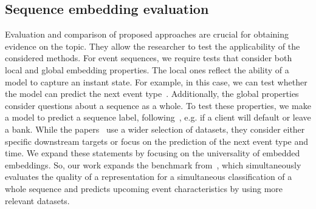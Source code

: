 \subsection{Sequence embedding evaluation}
Evaluation and comparison of proposed approaches are crucial for obtaining evidence on the topic. They allow the researcher to test the applicability of the considered methods.
For event sequences, we require tests that consider both local and global embedding properties.
The local ones reflect the ability of a model to capture an instant state.
For example, in this case, we can test whether the model can predict the next event type~\cite{shchur2021neural}.
Additionally, the global properties consider questions about a sequence as a whole. 
To test these properties, we make a model to predict a sequence label, following~\cite{babaev2022coles}, e.g. if a client will default or leave a bank.
While the papers~\cite{osin2024ebes,xue2023easytpp} use a wider selection of datasets, they consider either specific downstream targets or focus on the prediction of the next event type and time. 
We expand these statements by focusing on the universality of embedded embeddings.
So, our work expands the benchmark from~\cite{bazarova2024universal}, which simultaneously evaluates the quality of a representation for a simultaneous classification of a whole sequence and predicts upcoming event characteristics by using more relevant datasets. 






